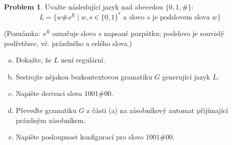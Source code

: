 \documentclass[a4paper,12pt]{article}
\theoremstyle{definition}
\newtheorem{problem}{Problem}
\begin{document}
\bigskip


\begin{problem}
    
    Uvažte následující jazyk nad abecedou $\{0,1,\#\}$:
    $$
    L = \{w \# s^R \mid w,s\in\{0,1\}^*\text{ a slovo $s$ je podslovem slova $w$}\}
    $$
    
    (Poznámka: $s^R$ označuje slovo $s$ napsané pozpátku; podslovo je souvislý podřetězec, vč. prázdného a celého slova.)

    \begin{enumerate}[(a)]  
        \item Dokažte, že $L$ není regulární.    
        \item Sestrojte nějakou bezkontextovou gramatiku $G$ generující jazyk $L$.
        \item Napište derivaci slova $1001\#00$.
        \item Převeďte gramatiku $G$ z části (a) na zásobníkový automat přijímající prázdným zásobníkem.
        \item Napište posloupnost konfigurací pro slovo $1001\#00$.
    \end{enumerate}

\end{problem}
\end{document}
